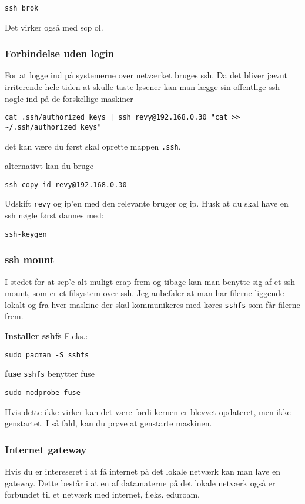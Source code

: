 \documentclass[10pt,a4paper,danish]{article}
\begin{document}
\begin{verbatim}
ssh brok
\end{verbatim}

Det virker også med scp ol.

\subsubsection{Forbindelse uden login}
For at logge ind på systemerne over netværket bruges ssh.
Da det bliver jævnt irriterende hele tiden at skulle taste løsener kan man lægge
sin offentlige ssh nøgle ind på de forskellige maskiner
\begin{verbatim}
cat .ssh/authorized_keys | ssh revy@192.168.0.30 "cat >> ~/.ssh/authorized_keys"
\end{verbatim}
det kan være du først skal oprette mappen \texttt{.ssh}.

alternativt kan du bruge
\begin{verbatim}
ssh-copy-id revy@192.168.0.30
\end{verbatim}
Udskift \texttt{revy} og ip'en med den relevante bruger og ip.
Husk at du skal have en ssh nøgle først
dannes med:

\begin{verbatim}
ssh-keygen
\end{verbatim}


\subsubsection{ssh mount}
I stedet for at scp'e alt muligt crap frem og tibage kan man benytte sig af et
ssh mount, som er et filsystem over ssh.
Jeg anbefaler at man har filerne liggende lokalt og fra hver maskine der skal
kommunikeres med køres \texttt{sshfs} som får filerne frem.

\textbf{Installer sshfs}
F.eks.:
\begin{verbatim}
sudo pacman -S sshfs
\end{verbatim}

\textbf{fuse}
\texttt{sshfs} benytter fuse
\begin{verbatim}
sudo modprobe fuse
\end{verbatim}
Hvis dette ikke virker kan det være fordi kernen er blevvet opdateret, men ikke
genstartet. I så fald, kan du prøve at genstarte maskinen.

\subsubsection{Internet gateway}
Hvis du er intereseret i at få internet på det lokale netværk kan man lave en
gateway.
Dette består i at en af datamaterne på det lokale netværk også er forbundet til
et netværk med internet, f.eks. eduroam.
\end{document}

